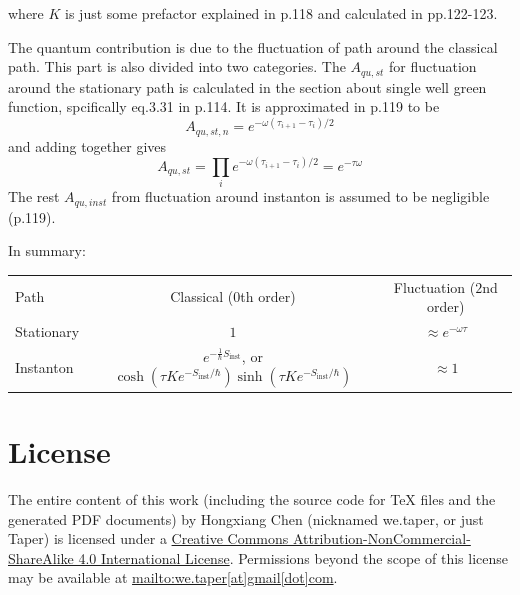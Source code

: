 \documentclass{article}
\begin{document}
where $K$ is just some prefactor explained in p.118 and calculated in
pp.122-123.

The quantum contribution is due to the fluctuation of path around the classical
path. This part is also divided into two categories. The $A_{qu,st}$ for
fluctuation around the stationary path is calculated in the section about single
well green function, spcifically eq.3.31 in p.114. It is approximated in p.119
to be
\begin{equation}
    A_{qu,st,n} = e^{-\omega(\tau_{i+1}-\tau_i)/2}
\end{equation}
and adding together gives
\begin{equation}
    A_{qu,st}= \prod_i e^{-\omega(\tau_{i+1}-\tau_i)/2} = e^{-\tau\omega}
\end{equation}
The rest $A_{qu,inst}$ from fluctuation around instanton is assumed to be
negligible (p.119).

In summary:
\begin{table}[H]
    \centering
    \begin{tabular}{l c c}
        Path       & Classical ($0$th order) & Fluctuation ($2$nd order) \\
        Stationary & $1$                     & $\approx e^{-\omega\tau}$  \\
        Instanton  & $e^{-\frac{1}{\hbar}S_{\text{inst}}}$, or $\cosh(\tau Ke^{-S_{\text{inst}}/\hbar}) \sinh(\tau Ke^{-S_{\text{inst}}/\hbar})$ & $\approx 1$\\
    \end{tabular}
\end{table}

\section{License}
The entire content of this work (including the source code
for TeX files and the generated PDF documents) by 
Hongxiang Chen (nicknamed we.taper, or just Taper) is
licensed under a 
\href{http://creativecommons.org/licenses/by-nc-sa/4.0/}{Creative 
Commons Attribution-NonCommercial-ShareAlike 4.0 International 
License}. Permissions beyond the scope of this 
license may be available at \url{mailto:we.taper[at]gmail[dot]com}.
\end{document}
